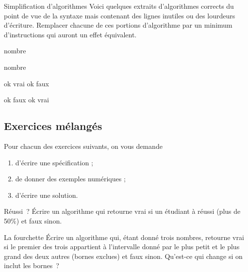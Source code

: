 	\begin{Exercice}{Simplification d’algorithmes}
	Voici quelques extraits d’algorithmes corrects du point de vue de la
	syntaxe mais contenant des lignes inutiles ou des lourdeurs d’écriture.
	Remplacer chacune de ces portions d’algorithme par un minimum
	d’instructions qui auront un effet équivalent.

	\begin{LDA}
		\Write nombre
	\EndIf
	\end{LDA}

	\begin{LDA}
	\If{ok = faux}
		\Write nombre
	\EndIf
	\end{LDA}

	\begin{LDA}
	\If{condition}
		\Let ok \Gets vrai
	\Else
		\Let ok \Gets faux
	\EndIf
	\end{LDA}

	\begin{LDA}
	\If{a $>$ b}
		\Let ok \Gets faux
	\Else
		\If{a $\leq$ b}
			\Let ok \Gets vrai
		\EndIf
	\EndIf
	\end{LDA}
	\end{Exercice}


	\subsection{Exercices mélangés}
	
		Pour chacun des exercices suivants,
		on vous demande
		\begin{enumerate}
		\item
			d'écrire une spécification ;
		\item
			de donner des exemples numériques ;
		\item
			d'écrire une solution.
		\end{enumerate}

		\begin{Exercice}{Réussi~?}
			Écrire un algorithme qui retourne vrai si un étudiant à réussi (plus de 50\%) 
			et faux sinon.
		\end{Exercice}		
		
		\begin{Exercice}{La fourchette}
			Écrire un algorithme qui, étant donné trois nombres, 
			retourne vrai si le premier des trois 
			appartient à l’intervalle donné par le plus petit et le plus grand 
			des deux autres (bornes exclues) et faux sinon. 
			Qu’est-ce qui change si on inclut les bornes~?
		\end{Exercice}
	
